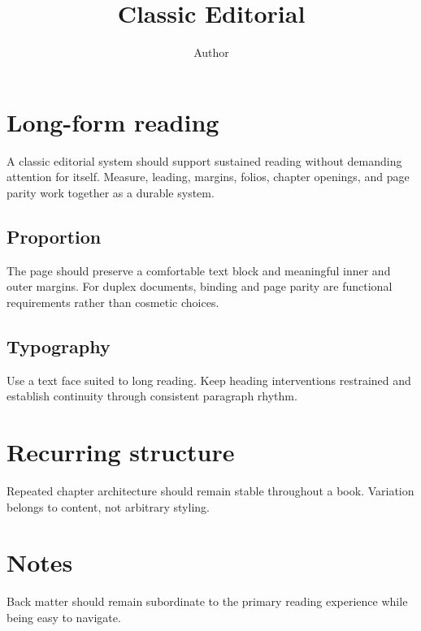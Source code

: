 \documentclass[11pt,a4paper,twoside,openright]{memoir}
\begin{document}
\frontmatter
\title{Classic Editorial}
\author{Author}
\date{}
\maketitle
\tableofcontents

\mainmatter
\chapter{Long-form reading}

A classic editorial system should support sustained reading without demanding attention
for itself. Measure, leading, margins, folios, chapter openings, and page parity work
together as a durable system.

\section{Proportion}
The page should preserve a comfortable text block and meaningful inner and outer margins.
For duplex documents, binding and page parity are functional requirements rather than
cosmetic choices.

\section{Typography}
Use a text face suited to long reading. Keep heading interventions restrained and establish
continuity through consistent paragraph rhythm.

\chapter{Recurring structure}
Repeated chapter architecture should remain stable throughout a book. Variation belongs
to content, not arbitrary styling.

\backmatter
\chapter{Notes}
Back matter should remain subordinate to the primary reading experience while being easy
to navigate.
\end{document}
